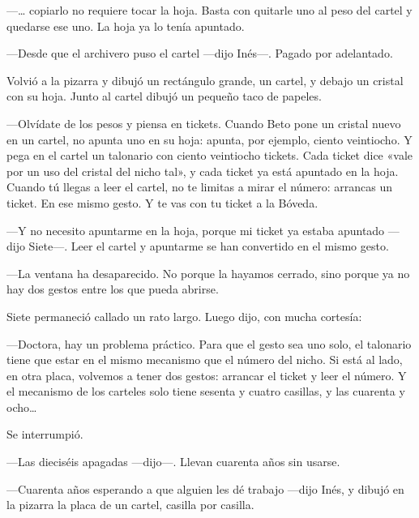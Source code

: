 ---\ldots{} copiarlo no requiere tocar la hoja. Basta con quitarle uno al peso del cartel y quedarse ese uno. La hoja ya lo tenía apuntado.

---Desde que el archivero puso el cartel ---dijo Inés---\nobreak. Pagado por adelantado.

Volvió a la pizarra y dibujó un rectángulo grande, un cartel, y debajo un cristal con su hoja. Junto al cartel dibujó un pequeño taco de papeles.

---Olvídate de los pesos y piensa en tickets. Cuando Beto pone un cristal nuevo en un cartel, no apunta uno en su hoja: apunta, por ejemplo, ciento veintiocho. Y pega en el cartel un talonario con ciento veintiocho tickets. Cada ticket dice «vale por un uso del cristal del nicho tal», y cada ticket ya está apuntado en la hoja. Cuando tú llegas a leer el cartel, no te limitas a mirar el número: arrancas un ticket. En ese mismo gesto. Y te vas con tu ticket a la Bóveda.

---Y no necesito apuntarme en la hoja, porque mi ticket ya estaba apuntado ---dijo Siete---\nobreak. Leer el cartel y apuntarme se han convertido en el mismo gesto.

---La ventana ha desaparecido. No porque la hayamos cerrado, sino porque ya no hay dos gestos entre los que pueda abrirse.

\escena
Siete permaneció callado un rato largo. Luego dijo, con mucha cortesía:

---Doctora, hay un problema práctico. Para que el gesto sea uno solo, el talonario tiene que estar en el mismo mecanismo que el número del nicho. Si está al lado, en otra placa, volvemos a tener dos gestos: arrancar el ticket y leer el número. Y el mecanismo de los carteles solo tiene sesenta y cuatro casillas, y las cuarenta y ocho\ldots

Se interrumpió.

---Las dieciséis apagadas ---dijo---\nobreak. Llevan cuarenta años sin usarse.

---Cuarenta años esperando a que alguien les dé trabajo ---dijo Inés, y dibujó en la pizarra la placa de un cartel, casilla por casilla.

\begin{center}
\end{center}

